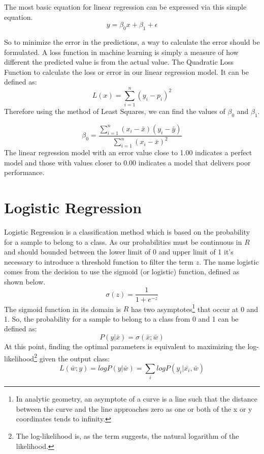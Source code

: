 \documentclass[12pt]{article}
\begin{document}
The most basic equation for linear regression can be expressed via this simple equation.
$$y = \beta_{0}x+\beta_{1}+\epsilon$$

So to minimize the error in the predictions, a way to calculate the error should be formulated. A loss function in machine learning is simply a measure of how different the predicted value is from the actual value. The Quadratic Loss Function to calculate the loss or error in our linear regression model. It can be defined as:
$$L(x) = \sum_{i=1}^{n}(y_{i}-p_{i})^{2} $$
Therefore using the method of Least Squares, we can find the values of $\beta_{0}$ and $\beta_{1}$.

$$
\beta_{0} = \frac{\sum_{i=1}^{n} ( x_{i}-\bar{x}) (y_{i}-\bar{y})}{\sum_{i=1}^{n} ( x_{i}-\bar{x})^{2} }
$$
The linear regression model with an error value close to 1.00 indicates a perfect model and those with values closer to 0.00 indicates a model that delivers poor performance.

\newpage
\section{Logistic Regression}
Logistic Regression is a classification method which is based on the probability for a sample to belong to a class. As our probabilities must be continuous in $R$ and should bounded between the lower limit of 0 and upper limit of 1 it's necessary to introduce a threshold function to filter the term $z$. The name logistic comes from the decision to use the sigmoid (or logistic) function, defined as shown below.
$$\sigma(z)= \dfrac{1}{1+e^{-z}}$$
The sigmoid function in its domain is $R$ has two asymptotes\footnote{In analytic geometry, an asymptote of a curve is a line such that the distance between the curve and the line approaches zero as one or both of the x or y coordinates tends to infinity.} that occur at 0 and 1. So, the probability for a sample to belong to a class from 0 and 1 can be defined as:
$$P(y|\bar{x})=\sigma(\bar{x};\bar{w})$$
At this point, finding the optimal parameters is equivalent to maximizing the log-likelihood\footnote{The log-likelihood is, as the term suggests, the natural logarithm of the likelihood.}
given the output class:
$$L(\bar{w};y) = log P(y|\bar{w}) = \sum_{i} log P(y_{i}|\bar{x_{i}}, \bar{w})$$


\newpage
\end{document}
